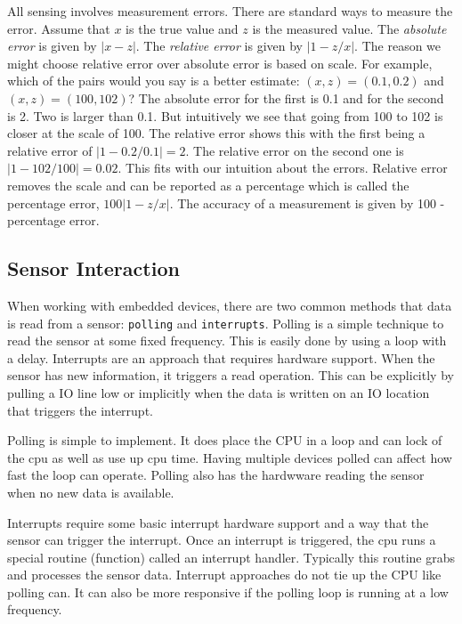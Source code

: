 All sensing involves measurement errors. There are standard ways to
measure the error. Assume that \(x\) is the true value and \(z\) is the
measured value. The \emph{absolute error} is given by \(| x - z|\). The
\emph{relative error} is given by \(| 1 - z/x|\). The reason we might
choose relative error over absolute error is based on scale. For
example, which of the pairs would you say is a better estimate:
\((x,z) = (0.1, 0.2)\) and \((x,z) = (100, 102)\)? The absolute error
for the first is 0.1 and for the second is 2. Two is larger than 0.1.
But intuitively we see that going from 100 to 102 is closer at the scale
of 100. The relative error shows this with the first being a relative
error of \(|1 - 0.2/0.1| = 2\). The relative error on the second one is
\(|1-102/100| = 0.02\). This fits with our intuition about the errors.
Relative error removes the scale and can be reported as a percentage
which is called the percentage error, \(100|1-z/x|\). The accuracy of a
measurement is given by 100 -percentage error.

\hypertarget{sensor-interaction}{%
\subsection{Sensor Interaction}\label{sensor-interaction}}

When working with embedded devices, there are two common methods that
data is read from a sensor: \texttt{polling} and \texttt{interrupts}.
Polling is a simple technique to read the sensor at some fixed
frequency. This is easily done by using a loop with a delay. Interrupts
are an approach that requires hardware support. When the sensor has new
information, it triggers a read operation. This can be explicitly by
pulling a IO line low or implicitly when the data is written on an IO
location that triggers the interrupt.

Polling is simple to implement. It does place the CPU in a loop and can
lock of the cpu as well as use up cpu time. Having multiple devices
polled can affect how fast the loop can operate. Polling also has the
hardwware reading the sensor when no new data is available.

Interrupts require some basic interrupt hardware support and a way that
the sensor can trigger the interrupt. Once an interrupt is triggered,
the cpu runs a special routine (function) called an interrupt handler.
Typically this routine grabs and processes the sensor data. Interrupt
approaches do not tie up the CPU like polling can. It can also be more
responsive if the polling loop is running at a low frequency.
